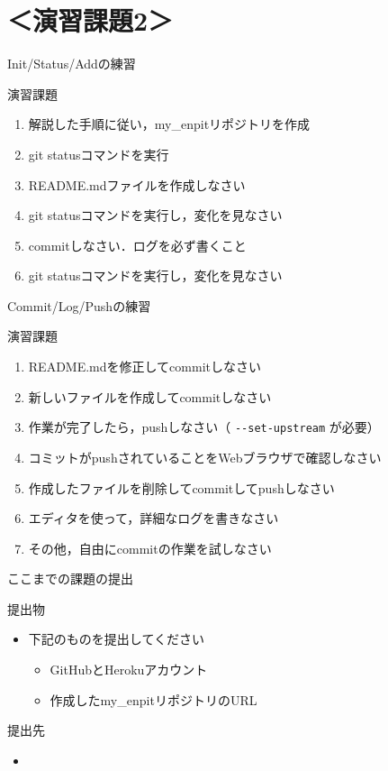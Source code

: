 \documentclass[t, aspectratio=169]{beamer}
\begin{document}
\section{＜演習課題2＞}
\label{sec-2-4}
\begin{frame}[label=sec-2-4-1]{Init/Status/Addの練習}
\begin{block}{演習課題}
\begin{enumerate}
\item 解説した手順に従い，my\_enpitリポジトリを作成
\item git statusコマンドを実行
\item README.mdファイルを作成しなさい
\item git statusコマンドを実行し，変化を見なさい
\item commitしなさい．ログを必ず書くこと
\item git statusコマンドを実行し，変化を見なさい
\end{enumerate}
\end{block}
\end{frame}

\begin{frame}[fragile,label=sec-2-4-2]{Commit/Log/Pushの練習}
 \begin{block}{演習課題}
\begin{enumerate}
\item README.mdを修正してcommitしなさい
\item 新しいファイルを作成してcommitしなさい
\item 作業が完了したら，pushしなさい（ \texttt{-{}-set-upstream} が必要）
\item コミットがpushされていることをWebブラウザで確認しなさい
\item 作成したファイルを削除してcommitしてpushしなさい
\item エディタを使って，詳細なログを書きなさい
\item その他，自由にcommitの作業を試しなさい
\end{enumerate}
\end{block}
\end{frame}

\begin{frame}[label=sec-2-4-3]{ここまでの課題の提出}
\begin{block}{提出物}
\begin{itemize}
\item 下記のものを提出してください
\begin{itemize}
\item GitHubとHerokuアカウント
\item 作成したmy\_enpitリポジトリのURL
\end{itemize}
\end{itemize}
\end{block}

\begin{block}{提出先}
\begin{itemize}
\item\relax [\href{https://docs.google.com/forms/d/1SiKQqDLQw2YiJieYVS79ywpHIaNC3uI9cNPb_ddhC1Q/viewform?usp=send_form}{enPiT演習アカウント(2014)}]
\end{itemize}
\end{block}
\end{frame}
\end{document}
